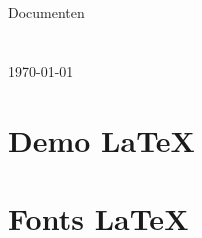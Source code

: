 \documentclass[11pt,a4paper]{article}
\begin{document}
 \thispagestyle{empty}
 \setlength{\parindent}{1em}
\vspace*{1cm}

\begin{center}
{\Large 
Documenten
~\\~\\~\\
\today

\vspace*{3cm}
}
\end{center}

\noindent
\newpage
\hypertarget{index}{}

\tableofcontents
\thispagestyle{empty}
\newpage
\setcounter{page}{1}

\section{Demo LaTeX}


\section{Fonts LaTeX}


 
\end{document}
